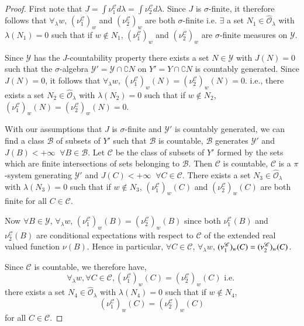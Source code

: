 \begin{proof}
First note that $J = \int \nu^\mathscr{C}_1 d \lambda = \int
\nu^\mathscr{C}_2 d \lambda$. Since $J$ is $\sigma$-finite, it
therefore follows that $\forall_\lambda w$, $(\nu^\mathscr{C}_1)_w$
and $(\nu^\mathscr{C}_2)_w$ are both $\sigma$-finite i.e. $\exists$ a
set $N_1 \in\hat{\mathscr{O}}_\lambda$ with $\lambda(N_1) = 0$ such
that if $w \not\in N_1$, $(\nu^\mathscr{C}_1)_w$ and
$(\nu^\mathscr{C}_2)_w$ are $\sigma$-finite measures on
$\mathscr{Y}$.\pageoriginale  

Since $\mathscr{Y}$ has the $J$-countability property there exists a
set $N \in \mathscr{Y}$ with $J(N) = 0$ such that the $\sigma$-algebra
$\mathscr{Y}' = \mathscr{Y} \cap \complement N$ on $Y' = Y \cap
\complement N$ is countably generated. Since $J(N) = 0$, it follows
that $\forall_\lambda w$, $(\nu^\mathscr{C}_1)_w (N) =
(\nu^\mathscr{C}_2)_w(N) = 0$. i.e., there exists a set $N_2 \in
\hat{\mathscr{O}}_\lambda$ with $\lambda(N_2) = 0$ such that if $w
\not\in N_2$, $(\nu^\mathscr{C}_1)_w(N) = (\nu^\mathscr{C}_2)_w(N) =
0$. 

With our assumptions that $J$ is $\sigma$-finite and $\mathscr{Y}'$ is
countably generated, we can find a class $\mathscr{B}$ of subsets of
$Y'$ such that $\mathscr{B}$ is countable, $\mathscr{B}$ generates
$\mathscr{Y}'$ and $J(B) < + \infty \;\;  \forall B \in \mathscr{B}$. Let
$\mathscr{C}$ be the class of subsets of $Y'$ formed by the sets which
are finite intersections of sets belonging to $\mathscr{B}$. Then
$\mathscr{C}$ is countable, $\mathscr{C}$ is a $\pi$-system generating
$\mathscr{Y}'$ and $J(C) < + \infty \;\; \forall C \in \mathscr{C}$. There
exists a set $N_3 \in\hat{\mathscr{O}}_\lambda$ with $\lambda (N_3) =
0$ such that if $w \not\in N_3$, $(\nu^\mathscr{C}_1)_w(C)$ and
$(\nu^\mathscr{C}_2)_w(C)$ are both finite for all $C \in
\mathscr{C}$. 

Now $\forall B \in \mathscr{Y}$, $\forall_\lambda w$,
$(\nu^\mathscr{C}_1)_w (B) = (\nu^\mathscr{C}_2)_w (B)$ since both
$\nu^\mathscr{C}_1(B)$ and $\nu^\mathscr{C}_2(B)$ are conditional
expectations with respect to $\mathscr{C}$ of the extended real valued
function $\nu(B)$. Hence in particular, $\forall C\in \mathscr{C}$,
$\forall_\lambda w$, $(\nu^\mathscr{C}_1)_w\break(C) =
(\nu^\mathscr{C}_2)_w(C)$. 

Since $\mathscr{C}$ is countable, we therefore have, 
$$
\forall_\lambda w, \forall C \in \mathscr{C}, (\nu^\mathscr{C}_1)_w(C)
= (\nu^\mathscr{C}_2)_w(C) \text{ i.e. }
$$
there exists a set $N_4 \in\hat{\mathscr{O}}_\lambda$ with
$\lambda(N_4) =0$ such that if $w \not\in N_4$, 
$$
(\nu^\mathscr{C}_1)_w(C) = (\nu^\mathscr{C}_2)_w(C)
$$
for all $C \in \mathscr{C}$. 


\end{proof}
